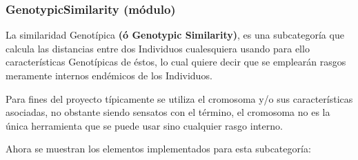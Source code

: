 \documentclass[letterpaper,10pt,english]{sphinxmanual}
\begin{document}
\subsubsection{GenotypicSimilarity (módulo)}
\label{Model/SharingFunction/GenotypicSimilarity/GenotypicSimilarity::doc}\label{Model/SharingFunction/GenotypicSimilarity/GenotypicSimilarity:genotypicsimilarity-modulo}
\begin{DUlineblock}{0em}
\item[] La similaridad Genotípica \textbf{(ó Genotypic Similarity)}, es una subcategoría
que calcula las distancias entre dos Individuos cualesquiera usando para ello
características Genotípicas de éstos, lo cual quiere decir que se emplearán rasgos
meramente internos endémicos de los Individuos.
\item[] 
\item[] Para fines del proyecto típicamente se utiliza el cromosoma y/o sus características asociadas,
no obstante siendo sensatos con el término, el cromosoma no es la única herramienta
que se puede usar sino cualquier rasgo interno.
\item[] 
\item[] Ahora se muestran los elementos implementados para esta subcategoría:
\end{DUlineblock}
\end{document}
